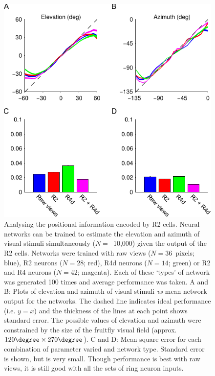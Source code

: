 \begin{figure}
\centering
\includegraphics{figures/elaz}
\caption{Analysing the positional information encoded by R2 cells.
Neural networks can be trained to estimate the elevation and azimuth of visual stimuli simultaneously ($N=$~10,000) given the output of the R2 cells.
Networks were trained with raw views ($N=36$~pixels; blue), R2 neurons ($N=28$; red), R4d neurons ($N=14$; green) or R2 and R4 neurons ($N=42$; magenta).
Each of these `types' of network was generated 100 times and average performance was taken.
A and B: Plots of elevation and azimuth of visual stimuli \emph{vs} mean network output for the networks.
The dashed line indicates ideal performance (i.e. $y=x$) and the thickness of the lines at each point shows standard error.
The possible values of elevation and azimuth were constrained by the size of the fruitfly visual field (approx. $120\degree \times 270\degree$).
C and D: Mean square error for each combination of parameter varied and network type.
Standard error is shown, but is very small.
Though performance is best with raw views, it is still good with all the sets of ring neuron inputs.
}
\label{fig:elaz}
\end{figure}
